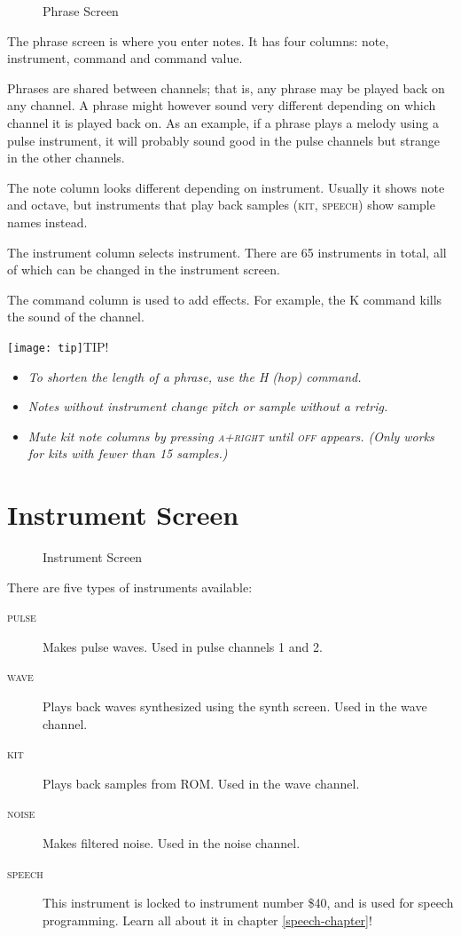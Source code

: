 \begin{figure}[hbtp]
\centering
{}
\caption{Phrase Screen}
\end{figure}

The phrase screen is where you enter notes. It has four columns: note, instrument, command and command value.

Phrases are shared between channels; that is, any phrase may be played back on any channel. A phrase might however sound very different depending on which channel it is played back on. As an example, if a phrase plays a melody using a pulse instrument, it will probably sound good in the pulse channels but strange in the other channels.

The note column looks different depending on instrument. Usually it shows note and octave, but instruments that play back samples (\textsc{kit}, \textsc{speech}) show sample names instead.

The instrument column selects instrument. There are 65 instruments in total, all of which can be changed in the instrument screen.

The command column is used to add effects. For example, the K command kills the sound of the channel.

\texttt{[image: tip]}TIP!
\begin{itemize}
    \item \textit{To shorten the length of a phrase, use the H (hop) command.}
    \item \textit{Notes without instrument change pitch or sample without a retrig.}
    \item \textit{Mute kit note columns by pressing \textsc{a+right} until \textsc{off} appears. (Only works for kits with fewer than 15 samples.)}
\end{itemize}

\section{Instrument Screen}

\begin{figure}[hbtp]
\centering
{}
\caption{Instrument Screen}
\label{fig:instr2}
\end{figure}

There are five types of instruments available:

\begin{description}
\item[\textsc{pulse}] Makes pulse waves. Used in pulse channels 1 and 2.
\item[\textsc{wave}] Plays back waves synthesized using the synth screen. Used in the wave channel.
\item[\textsc{kit}] Plays back samples from ROM. Used in the wave channel.
\item[\textsc{noise}] Makes filtered noise. Used in the noise channel.
\item[\textsc{speech}] This instrument is locked to instrument number \$40, and is used for speech programming. Learn all about it in chapter \ref{speech-chapter}!
\end{description}

